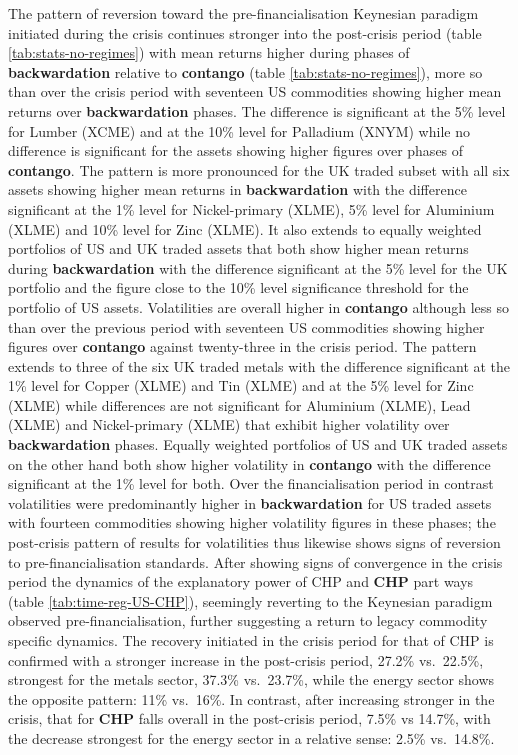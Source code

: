 \documentclass[]{elsarticle} %
\begin{document}
The pattern of reversion toward the pre-financialisation Keynesian paradigm initiated during the crisis continues stronger into the post-crisis period (table \ref{tab:stats-no-regimes}) with mean returns higher during phases of \textbf{backwardation} relative to \textbf{contango} (table \ref{tab:stats-no-regimes}), more so than over the crisis period with seventeen US commodities showing higher mean returns over \textbf{backwardation} phases. The difference is significant at the 5\% level for Lumber (XCME) and at the 10\% level for Palladium (XNYM) while no difference is significant for the assets showing higher figures over phases of \textbf{contango}. The pattern is more pronounced for the UK traded subset with all six assets showing higher mean returns in \textbf{backwardation} with the difference significant at the 1\% level for Nickel-primary (XLME), 5\% level for Aluminium (XLME) and 10\% level for Zinc (XLME). It also extends to equally weighted portfolios of US and UK traded assets that both show higher mean returns during \textbf{backwardation} with the difference significant at the 5\% level for the UK portfolio and the figure close to the 10\% level significance threshold for the portfolio of US assets. Volatilities are overall higher in \textbf{contango} although less so than over the previous period with seventeen US commodities showing higher figures over \textbf{contango} against twenty-three in the crisis period. The pattern extends to three of the six UK traded metals with the difference significant at the 1\% level for Copper (XLME) and Tin (XLME) and at the 5\% level for Zinc (XLME) while differences are not significant for Aluminium (XLME), Lead (XLME) and Nickel-primary (XLME) that exhibit higher volatility over \textbf{backwardation} phases. Equally weighted portfolios of US and UK traded assets on the other hand both show higher volatility in \textbf{contango} with the difference significant at the 1\% level for both. Over the financialisation period in contrast volatilities were predominantly higher in \textbf{backwardation} for US traded assets with fourteen commodities showing higher volatility figures in these phases; the post-crisis pattern of results for volatilities thus likewise shows signs of reversion to pre-financialisation standards. After showing signs of convergence in the crisis period the dynamics of the explanatory power of CHP and \textbf{CHP} part ways (table \ref{tab:time-reg-US-CHP}), seemingly reverting to the Keynesian paradigm observed pre-financialisation, further suggesting a return to legacy commodity specific dynamics. The recovery initiated in the crisis period for that of CHP is confirmed with a stronger increase in the post-crisis period, 27.2\% vs.~22.5\%, strongest for the metals sector, 37.3\% vs.~23.7\%, while the energy sector shows the opposite pattern: 11\% vs.~16\%. In contrast, after increasing stronger in the crisis, that for \textbf{CHP} falls overall in the post-crisis period, 7.5\% vs 14.7\%, with the decrease strongest for the energy sector in a relative sense: 2.5\% vs.~14.8\%.\\
\end{document}
